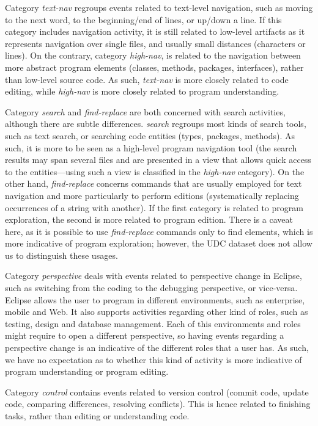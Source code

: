 \documentclass[times]{smrauth}
\newcommand\RR[1]{\textbf{Romain #1}}
\begin{document}
Category \emph{text-nav} regroups events related to text-level navigation, such as moving to the next word, to the beginning/end of lines, or up/down a line. If this category includes navigation activity, it is still related to low-level artifacts as it represents navigation over single files, and usually small distances (characters or lines). On the contrary, category \emph{high-nav}, is related to the navigation between more abstract program elements (classes, methods, packages, interfaces), rather than low-level source code. As such, \emph{text-nav} is more closely related to code editing, while \emph{high-nav} is more closely related to program understanding.

Category \emph{search} and \emph{find-replace} are both concerned with search activities, although there are subtle differences. \emph{search} regroups most kinds of search tools, such as text search, or searching code entities (types, packages, methods). As such, it is more to be seen as a high-level program navigation tool (the search results may span several files and are presented in a view that allows quick access to the entities---using such a view is classified in the \emph{high-nav} category). On the other hand, \emph{find-replace} concerns commands that are usually employed for text navigation and more particularly to perform editions (systematically replacing occurrences of a string with another). If the first category is related to program exploration, the second is more related to program edition. There is a caveat here, as it is possible to use \emph{find-replace} commands only to find elements, which is more indicative of program exploration; however, the UDC dataset does not allow us to distinguish these usages.

Category \emph{perspective} deals with events related to perspective change in Eclipse, such as switching from the coding to the debugging perspective, or vice-versa. Eclipse allows the user to program in different environments, such as enterprise, mobile and Web. It also supports activities regarding other kind of roles, such as testing, design and database management. Each of this environments and roles might require to open a different perspective, so having events regarding a perspective change is an indicative of the different roles that a user has.
As such, we have no expectation as to whether this kind of activity is more indicative of program understanding or program editing. %

Category \emph{control} contains events related to version control (commit code, update code, comparing differences, resolving conflicts). This is hence related to finishing tasks, rather than editing or understanding code. 
\end{document}
